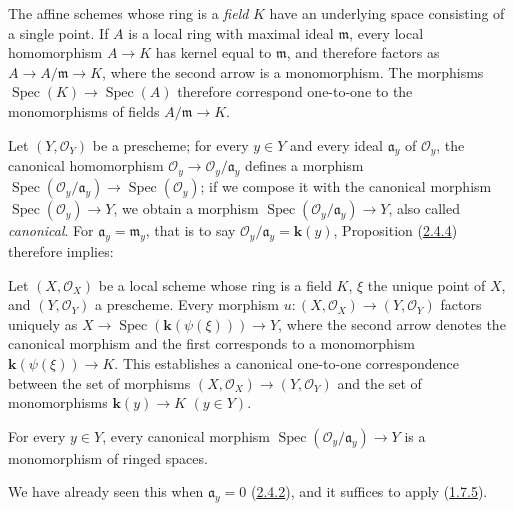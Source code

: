 \begin{env}[2.4.5]
\label{I.2.4.5}
The affine schemes whose ring is a \emph{field} $K$ have an underlying
space consisting of a single point. If $A$ is a local ring with maximal
ideal $\mathfrak{m}$, every local homomorphism $A\to K$ has kernel equal to
$\mathfrak{m}$, and therefore factors as
$A\to A/\mathfrak{m}\to K$, where the second arrow is a monomorphism. The
morphisms $\operatorname{Spec}(K)\to\operatorname{Spec}(A)$ therefore
correspond one-to-one to the monomorphisms of fields
$A/\mathfrak{m}\to K$.
\end{env}

Let $(Y,\mathscr{O}_Y)$ be a prescheme; for every $y\in Y$ and every ideal
$\mathfrak{a}_y$ of $\mathscr{O}_y$, the canonical homomorphism
$\mathscr{O}_y\to\mathscr{O}_y/\mathfrak{a}_y$ defines a morphism
$\operatorname{Spec}(\mathscr{O}_y/\mathfrak{a}_y)
\to\operatorname{Spec}(\mathscr{O}_y)$; if we compose it with the canonical
morphism $\operatorname{Spec}(\mathscr{O}_y)\to Y$, we obtain a morphism
$\operatorname{Spec}(\mathscr{O}_y/\mathfrak{a}_y)\to Y$, also called
\emph{canonical}. For $\mathfrak{a}_y=\mathfrak{m}_y$, that is to say
$\mathscr{O}_y/\mathfrak{a}_y=\boldsymbol{k}(y)$, Proposition
(\hyperref[I.2.4.4]{2.4.4}) therefore implies:

\begin{corollary}[2.4.6]
\label{I.2.4.6}
Let $(X,\mathscr{O}_X)$ be a local scheme whose ring is a field $K$,
$\xi$ the unique point of $X$, and $(Y,\mathscr{O}_Y)$ a prescheme. Every
morphism $u:(X,\mathscr{O}_X)\to(Y,\mathscr{O}_Y)$ factors uniquely as
$X\to\operatorname{Spec}(\boldsymbol{k}(\psi(\xi)))\to Y$, where the second arrow denotes
the canonical morphism and the first corresponds to a monomorphism
$\boldsymbol{k}(\psi(\xi))\to K$. This establishes a canonical one-to-one correspondence
between the set of morphisms $(X,\mathscr{O}_X)\to(Y,\mathscr{O}_Y)$ and
the set of monomorphisms $\boldsymbol{k}(y)\to K$ $(y\in Y)$.
\end{corollary}

\begin{corollary}[2.4.7]
\label{I.2.4.7}
For every $y\in Y$, every canonical morphism
$\operatorname{Spec}(\mathscr{O}_y/\mathfrak{a}_y)\to Y$ is a monomorphism
of ringed spaces.
\end{corollary}

We have already seen this when $\mathfrak{a}_y=0$
(\hyperref[I.2.4.2]{2.4.2}), and it suffices to apply
(\hyperref[I.1.7.5]{1.7.5}).

